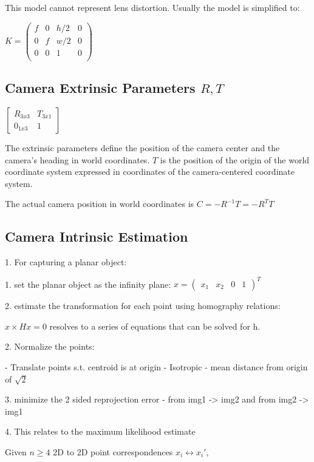 This model cannot represent lens distortion. Usually the model is simplified to:

$ K = \left( \begin{matrix} 
f & 0 & h/2 & 0 \\
0 & f  & w/2 & 0 \\
0 & 0 &  1 & 0 \\
\end{matrix}
\right) $

\subsection{Camera Extrinsic Parameters $R,T$}

$ \left[ 
\begin{matrix} 
R_{3x3} & T_{3x1} \\
0_{1x3} & 1 
\end{matrix}
\right] $

The extrinsic parameters define the position of the camera center and the camera's heading in world coordinates. $T$ is the position of the origin of the world coordinate system expressed in coordinates of the camera-centered coordinate system. 

The actual camera position in world coordinates is $C = -R^{-1}T=-R^{T}T $

\subsection{Camera Intrinsic Estimation}
1. For capturing a planar object:

   1. set the planar object as the infinity plane: $x = ( \begin{matrix} x_1 & x_2 & 0 & 1 \end{matrix})^T$

   2. estimate the transformation for each point using homography relations:

      $ x \times H x = 0$ resolves to a series of equations that can be solved for h.

2. Normalize the points:

   - Translate points s.t. centroid is at origin
   - Isotropic - mean distance from origin of $\sqrt 2 $

3. minimize the 2 sided reprojection error - from img1 -> img2 and from img2 -> img1

4. This relates to the maximum likelihood estimate

 Given $n\ge 4$ 2D to 2D point correspondences {$x_i\leftrightarrow x_i\prime$},

